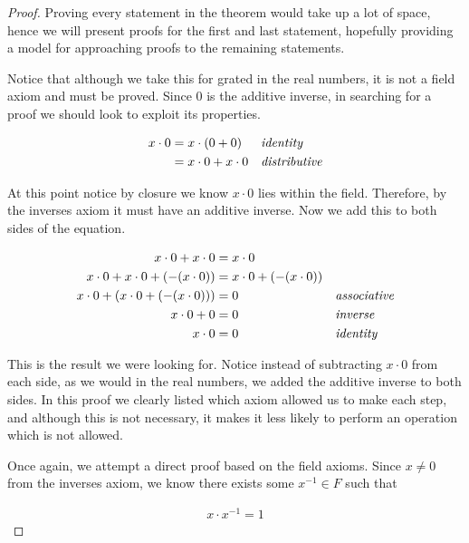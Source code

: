 \begin{proof}
	Proving every statement in the theorem would take up a lot of space, hence we will present proofs for the first and last statement, hopefully providing a model for approaching proofs to the remaining statements.
	
	
	Notice that although we take this for grated in the real numbers, it is not a field axiom and must be proved. Since 0 is the additive inverse, in searching for a proof we should look to exploit its properties.

	\begin{align*}
		x \cdot 0 &= x \cdot (0 + 0) &&\emph{identity} \\
		&= x \cdot 0 + x \cdot 0 &&\emph{distributive}
	\end{align*}
	
	At this point notice by closure we know $x \cdot 0$ lies within the field. Therefore, by the inverses axiom it must have an additive inverse. Now we add this to both sides of the equation.
	
	\begin{align*}
		x \cdot 0 + x \cdot 0 &= x \cdot 0 && \\
		x \cdot 0 + x \cdot 0 + (-(x \cdot 0)) &= x \cdot 0 + (-(x \cdot 0)) && \\
		x \cdot 0 + (x \cdot 0 + (-(x \cdot 0))) &= 0  &&\emph{associative} \\
		x \cdot 0 + 0 &= 0 &&\emph{inverse} \\
		x \cdot 0 &= 0 &&\emph{identity}
	\end{align*}
	
	This is the result we were looking for. Notice instead of subtracting $x \cdot 0$ from each side, as we would in the real numbers, we added the additive inverse to  both sides. In this proof we clearly listed which axiom allowed us to make each step, and although this is not necessary, it makes it less likely to perform an operation which is not allowed.
	
	
	Once again, we attempt a direct proof based on the field axioms. Since $x \neq 0$ from the inverses axiom, we know there exists some $x^{-1} \in F$ such that
	
	\begin{align*}
		x \cdot x^{-1} = 1
	\end{align*}
	

\end{proof}
